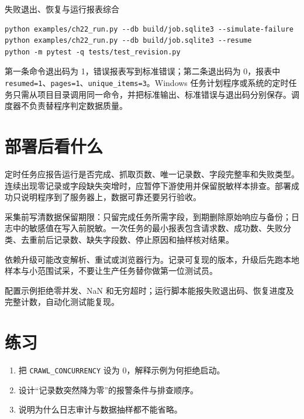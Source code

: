 \begin{example}{失败退出、恢复与运行报表}{综合}
\end{example}

\begin{Verbatim}[numbers=none]
python examples/ch22_run.py --db build/job.sqlite3 --simulate-failure
python examples/ch22_run.py --db build/job.sqlite3 --resume
python -m pytest -q tests/test_revision.py
\end{Verbatim}
第一条命令退出码为 1，错误报表写到标准错误；第二条退出码为 0，报表中 \texttt{resumed=1}、\texttt{pages=1}、\texttt{unique\_items=3}。Windows 任务计划程序或系统的定时任务只需从项目目录调用同一命令，并把标准输出、标准错误与退出码分别保存。调度器不负责替程序判定数据质量。

\section{部署后看什么}
定时任务应报告运行是否完成、抓取页数、唯一记录数、字段完整率和失败类型。连续出现零记录或字段缺失突增时，应暂停下游使用并保留脱敏样本排查。部署成功只说明程序到了服务器上，数据可靠还要另行验收。

采集前写清数据保留期限：只留完成任务所需字段，到期删除原始响应与备份；日志中的敏感值在写入前脱敏。一次任务的最小报表包含请求数、成功数、失败分类、去重前后记录数、缺失字段数、停止原因和抽样核对结果。

\begin{warning}
依赖升级可能改变解析、重试或浏览器行为。记录可复现的版本，升级后先跑本地样本与小范围试采，不要让生产任务替你做第一位测试员。
\end{warning}

\begin{tcolorbox}[title=本章验收,colframe=Teal,colback=Teal!3]
配置示例拒绝零并发、NaN 和无穷超时；运行脚本能报失败退出码、恢复进度及完整计数，自动化测试能复现。
\end{tcolorbox}

\section{练习}
\begin{enumerate}[label=\arabic*.]
\item 把 \texttt{CRAWL\_CONCURRENCY} 设为 0，解释示例为何拒绝启动。
\item 设计“记录数突然降为零”的报警条件与排查顺序。
\item 说明为什么日志审计与数据抽样都不能省略。
\end{enumerate}
